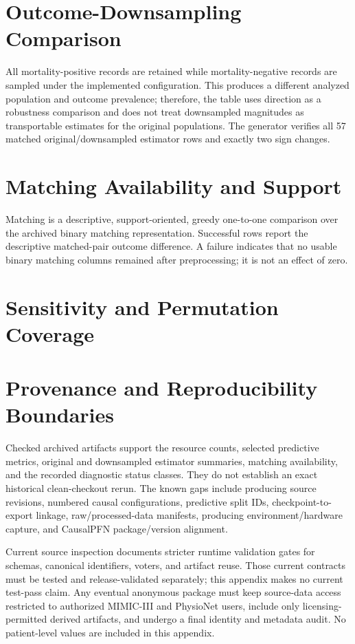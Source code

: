 \documentclass[letterpaper,10pt]{article}
\begin{document}


\section{Outcome-Downsampling Comparison}

All mortality-positive records are retained while mortality-negative records are
sampled under the implemented configuration.  This produces a different
analyzed population and outcome prevalence; therefore, the table uses direction
as a robustness comparison and does not treat downsampled magnitudes as
transportable estimates for the original populations.  The generator verifies
all 57 matched original/downsampled estimator rows and exactly two sign changes.



\section{Matching Availability and Support}

Matching is a descriptive, support-oriented, greedy one-to-one comparison over
the archived binary matching representation.  Successful rows report the
descriptive matched-pair outcome difference.  A failure indicates that no usable
binary matching columns remained after preprocessing; it is not an effect of
zero.



\section{Sensitivity and Permutation Coverage}



\section{Provenance and Reproducibility Boundaries}

Checked archived artifacts support the resource counts, selected predictive
metrics, original and downsampled estimator summaries, matching availability,
and the recorded diagnostic status classes.  They do not establish an exact
historical clean-checkout rerun.  The known gaps include producing source
revisions, numbered causal configurations, predictive split IDs,
checkpoint-to-export linkage, raw/processed-data manifests, producing
environment/hardware capture, and CausalPFN package/version alignment.

Current source inspection documents stricter runtime validation gates for
schemas, canonical identifiers, voters, and artifact reuse.  Those current
contracts must be tested and release-validated separately; this appendix makes
no current test-pass claim.  Any eventual anonymous package must keep
source-data access restricted to authorized MIMIC-III and PhysioNet users,
include only licensing-permitted derived artifacts, and undergo a final identity
and metadata audit.  No patient-level values are included in this appendix.
\end{document}
